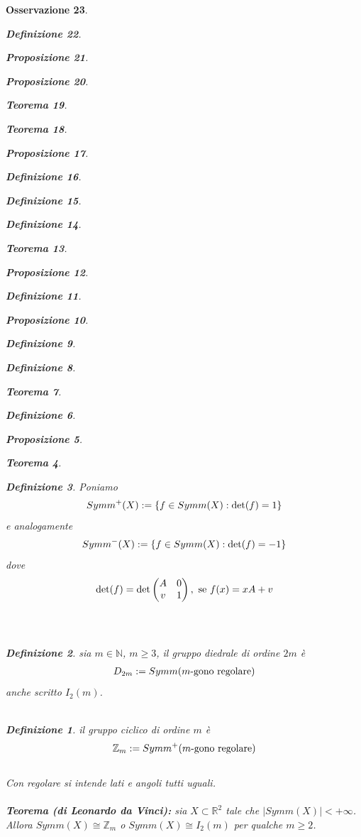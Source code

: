 \documentclass[oneside, 11pt]{amsbook}
\newcommand{\0}{{(0)}}
\newcommand{\3}{{(3)}}
\theoremstyle{colonplain}
\newtheorem{thm}{Teorema}[chapter]
\newtheorem{prop}[thm]{Proposizione}
\theoremstyle{colondefinition}
\newtheorem{defn}[thm]{Definizione}
\theoremstyle{colonremark}
\newtheorem{rmk}[thm]{Osservazione}
\numberwithin{equation}{chapter}
\begin{document}
\begin{rmk}
\begin{defn}
\begin{prop}
\begin{prop}
\begin{thm}
\begin{thm}
\begin{prop}
\begin{defn}
\begin{defn}
\begin{defn}
\begin{thm}
\begin{prop}
\begin{defn}
\begin{prop}
\begin{defn}
\begin{defn}
\begin{thm}
\begin{defn}
\begin{prop}
\begin{thm}
\begin{defn}
Poniamo
\begin{align}
    Symm^+(X) := \{ f \in Symm(X) : \det (f) = 1 \} \notag
\end{align}
e analogamente
\begin{align}
    Symm^-(X) := \{ f \in Symm(X) : \det (f) = -1 \} \notag
\end{align}
dove
\begin{align}
    \det (f) = \det \begin{pmatrix}
        A & 0 \\
        v & 1
    \end{pmatrix}, \text{ se } f(x) = xA + v \notag
\end{align} \\ \\
\begin{defn} sia $m \in \mathbb{N}$, $m \geq 3$, il \textit{gruppo diedrale} di ordine $2m$ è
\begin{align}
    D_{2m} := Symm(m\text{-gono regolare}) \notag
\end{align}
anche scritto $I_2(m)$. \\ \\
\begin{defn} il \textit{gruppo ciclico} di ordine $m$ è
\begin{align}
    \mathbb{Z}_m := Symm^+(m\text{-gono regolare}) \notag
\end{align} \\
Con regolare si intende lati e angoli tutti uguali. \\ \\
\textbf{Teorema (di Leonardo da Vinci):} sia $X \subset \mathbb{R}^2$ tale che $|Symm(X)| < +\infty$. Allora $Symm(X) \cong \mathbb{Z}_m$ o $Symm(X) \cong I_2(m)$ per qualche $m \geq 2$. \\


\end{defn}
\end{defn}
\end{defn}
\end{thm}
\end{prop}
\end{defn}
\end{thm}
\end{defn}
\end{defn}
\end{prop}
\end{defn}
\end{prop}
\end{thm}
\end{defn}
\end{defn}
\end{defn}
\end{prop}
\end{thm}
\end{thm}
\end{prop}
\end{prop}
\end{defn}
\end{rmk}
\end{document}
